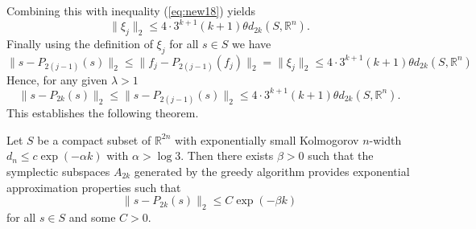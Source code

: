 Combining this with inequality (\ref{eq:new18}) yields
\begin{equation} \label{eq:new20}
	\| \xi_j \|_2 \leq 4\cdot 3^{k+1} (k+1) \theta d_{2k}(S,\mathbb R^n).
\end{equation}
Finally using the definition of $\xi_j$ for all $s\in S$ we have
\begin{equation} \label{eq:new21}
	\| s - P_{2(j-1)}(s) \|_2 \leq \| f_j - P_{2(j-1)}(f_j) \|_2 = \|\xi_j \|_2 \leq 4\cdot 3^{k+1} (k+1) \theta d_{2k}(S,\mathbb R^n)
\end{equation}
Hence, for any given $\lambda > 1$
\begin{equation} \label{eq:new22}
	\| s - P_{2k}(s) \|_2 \leq \| s - P_{2(j-1)}(s) \|_2 \leq 4\cdot 3^{k+1} (k+1) \theta d_{2k}(S,\mathbb R^n).
\end{equation}
This establishes the following theorem.
\begin{theorem}
	Let $S$ be a compact subset of $\mathbb{R}^{2n}$ with exponentially small Kolmogorov $n$-width $d_{n}\leq c\exp(-\alpha k)$ with $\alpha > \log3$. Then there exists $\beta>0$ such that the symplectic subspaces $A_{2k}$ generated by the greedy algorithm provides exponential approximation properties such that
\begin{equation} \label{eq:new23}
	\| s - P_{2k}(s) \|_2 \leq C \exp(-\beta k)
\end{equation}
for all $s\in S$ and some $C>0$.
\end{theorem}

